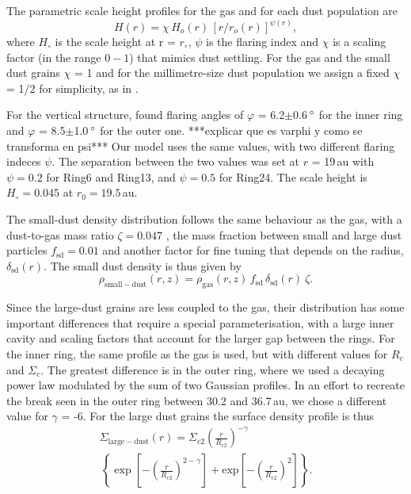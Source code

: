\documentclass[letters,usenatbib,times]{mnras}
\begin{document}
The parametric scale height profiles for the gas and for each dust population are 
\begin{equation}
    \label{scale}
  H(r)=\chi \, H_{o}(r) \, [r/r_{o}(r)]^{\psi(r)},
\end{equation}
where $H_\circ$ is the scale height at r = $r_\circ$, $\psi$ is the flaring index and $\chi$ is a scaling factor (in the range $0-1$) that mimics dust settling. For the gas and the small dust grains $\chi$ = 1 and for the millimetre-size dust population we assign a fixed $\chi$ = 1/2 for simplicity, as in \citet{Rosenfeld_2013}.

For the vertical structure, \citet{dOrazi} found flaring angles of $\varphi$ = 6.2$\pm$0.6\,$\hbox{$^\circ$}$ for the inner ring and $\varphi$ = 8.5$\pm$1.0\,$\hbox{$^\circ$}$ for the outer one. ***explicar que es varphi y como se transforma en psi*** Our model uses the same values, with two different flaring indeces $\psi$. The separation between the two values was set at $r$ = 19\,au with $\psi=0.2$ for  Ring6 and Ring13, and $\psi=0.5$ for Ring24. The scale height is  $H_\circ = 0.045$ at $r_0 = 19.5$\,au.

The small-dust density distribution follows the same behaviour as the gas, with a dust-to-gas mass ratio $\zeta = 0.047$ \citep[as in][]{Rosenfeld_2013}, the mass fraction between small and large dust particles $f_\mathrm{sd}=0.01$ and another factor for fine tuning that depends on the radius,  $\delta_{\mathrm{sd}}(r)$. The small dust density is thus given by 
\begin{equation}
\rho_{\mathrm{small-dust}}(r,z)=\rho_{\mathrm{gas}}(r,z)\, f_{\mathrm{sd}} \, \delta_{\mathrm{sd}}(r) \: \zeta .
\end{equation}

Since the large-dust grains are less coupled to the gas, their distribution has some important differences that require a special parameterisation, with a large inner cavity and scaling factors that account for  the larger gap between the rings. For the inner ring, the same profile as the gas is used, but with different values for $R_c$ and $\Sigma_c$. The greatest difference is in the outer ring, where we used a decaying power law modulated by the sum of two    Gaussian profiles. In an effort to recreate the break seen in the outer ring between 30.2 and 36.7\,au, we chose a different value for $\gamma$ = -6. For the large dust grains the surface density profile is thus
\begin{multline}
  \Sigma_{\mathrm{large-dust}}(r) = \Sigma_{\mathrm{c}2} \left(\frac{r}{R_{\mathrm{c}2}}\right)^{-\gamma}  \\ \, \left\{ \exp\left[-\left(\frac{r}{R_{\mathrm{c}2}}\right)^{2-\gamma}\right] +  \mathrm{exp}\left[-\left(\frac{r}{R_{\mathrm{c}2}}\right)^{2}\right]\right\}.
\end{multline}
\end{document}
